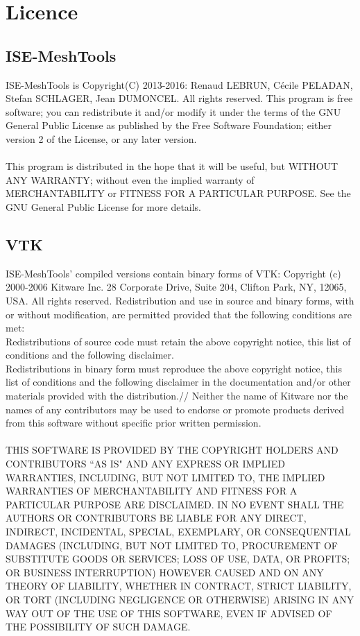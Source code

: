 \chapter{Licence}
    
		\minitoc
		
    \section{ISE-MeshTools}
ISE-MeshTools is Copyright(C) 2013-2016: Renaud LEBRUN, Cécile PELADAN, Stefan SCHLAGER, Jean DUMONCEL. All rights reserved.
This program is free software; you can redistribute it and/or modify it under the terms of the GNU 
General Public License as published by the Free Software Foundation; either version 2 of the License, 
or any later version.\\\\
This program is distributed in the hope that it will be useful, but WITHOUT ANY WARRANTY; without 
even the implied warranty of MERCHANTABILITY or FITNESS FOR A PARTICULAR PURPOSE. See the 
GNU General Public License for more details.

    \section{VTK}
  ISE-MeshTools' compiled versions contain binary forms of VTK: Copyright (c) 2000-2006 Kitware Inc. 28 
Corporate Drive, Suite 204, Clifton Park, NY, 12065, USA. All rights reserved. Redistribution and use 
in source and binary forms, with or without modification, are permitted provided that the following 
conditions are met:\\
    Redistributions of source code must retain the above copyright notice, this list of conditions and 
the following disclaimer.\\
    Redistributions in binary form must reproduce the above copyright notice, this list of conditions 
and the following disclaimer in the documentation and/or other materials provided with the distribution.//
    Neither the name of Kitware nor the names of any contributors may be used to endorse or promote products derived from this software without specific prior written permission.\\\\
THIS SOFTWARE IS PROVIDED BY THE COPYRIGHT HOLDERS AND CONTRIBUTORS ``AS IS" AND ANY 
EXPRESS OR IMPLIED WARRANTIES, INCLUDING, BUT NOT LIMITED TO, THE IMPLIED WARRANTIES 
OF MERCHANTABILITY AND FITNESS FOR A PARTICULAR PURPOSE ARE DISCLAIMED. IN NO EVENT 
SHALL THE AUTHORS OR CONTRIBUTORS BE LIABLE FOR ANY DIRECT, INDIRECT, INCIDENTAL, SPECIAL, 
EXEMPLARY, OR CONSEQUENTIAL DAMAGES (INCLUDING, BUT NOT LIMITED TO, PROCUREMENT OF 
SUBSTITUTE GOODS OR SERVICES; LOSS OF USE, DATA, OR PROFITS; OR BUSINESS INTERRUPTION) 
HOWEVER CAUSED AND ON ANY THEORY OF LIABILITY, WHETHER IN CONTRACT, STRICT LIABILITY, 
OR TORT (INCLUDING NEGLIGENCE OR OTHERWISE) ARISING IN ANY WAY OUT OF THE USE OF THIS 
SOFTWARE, EVEN IF ADVISED OF THE POSSIBILITY OF SUCH DAMAGE.
